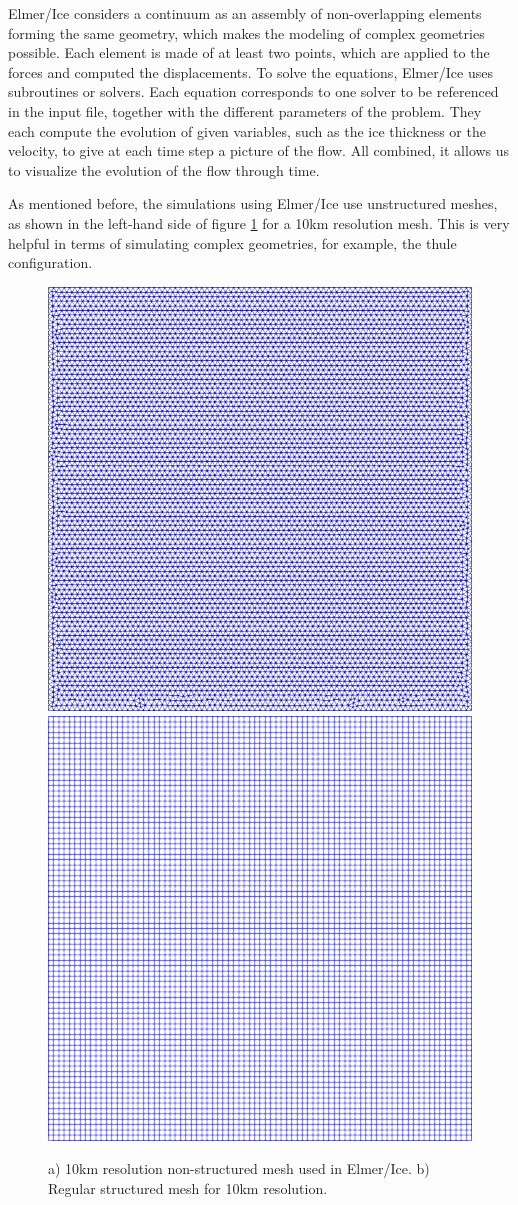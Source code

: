 \documentclass{article}
\begin{document}
 Elmer/Ice considers a continuum as an assembly of non-overlapping elements forming the same geometry, which makes the modeling of complex geometries possible. Each element is made of at least two points, which are applied to the forces and computed the displacements. To solve the equations, Elmer/Ice uses subroutines or solvers. Each equation corresponds to one solver to be referenced in the input file, together with the different parameters of the problem. They each compute the evolution of given variables, such as the ice thickness or the velocity, to give at each time step a picture of the flow. All combined, it allows us to visualize the evolution of the flow through time.
 
 As mentioned before, the simulations using Elmer/Ice use unstructured meshes, as shown in the left-hand side of figure \ref{meshes} for a 10km resolution mesh. This is very helpful in terms of simulating complex geometries, for example, the thule configuration.
 
 \begin{figure}[!h]
 	\centering
 	\includegraphics[width=0.45\linewidth]{../fig/non_structured_grid_10km.png}
 	\includegraphics[width=0.45\linewidth]{../fig/regular_grid_10km.png}
 	\caption{a) 10km resolution non-structured mesh used in Elmer/Ice. b) Regular structured mesh for 10km resolution.}
 	\label{meshes}
 \end{figure}
\end{document}
